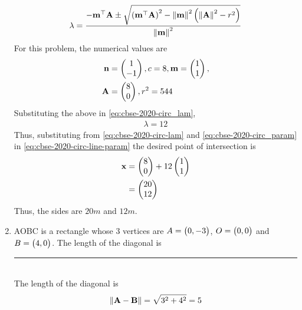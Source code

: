 \documentclass[journal,12pt,twocolumn]{IEEEtran}
\begin{document}
\begin{enumerate}
{\begin{align}
			    \label{eq:cbse-2020-circ_lam}
		\lambda = \frac{-\mathbf{m}^{\top}\mathbf{A}\pm \sqrt{\left(\mathbf{m}^{\top}\mathbf{A}\right)^2 -\left\lVert\mathbf{m}\right\rVert^2\left(\left\lVert\mathbf{A}\right\rVert^2 - r^2 \right)}}{\left\lVert\mathbf{m}\right\rVert^2}
		    \end{align}
		    }
		    For this problem, the numerical values are
		    \begin{align}
			    \label{eq:cbse-2020-circ_param}
			    \mathbf{n} &= \begin{pmatrix}1 \\ -1\end{pmatrix}, c = 8, 
		\mathbf{m} = \begin{pmatrix}1 \\ 1\end{pmatrix}, 
			    \\
			     \mathbf{A} &= \begin{pmatrix}8 \\ 0\end{pmatrix},  r^2 = 544
		    \end{align}
		    Substituting the above in 
			    \eqref{eq:cbse-2020-circ_lam}, 
		    \begin{align}
			    \lambda = 12
			    \label{eq:cbse-2020-circ-lam}
		    \end{align}
		    Thus, substituting from 
			    \eqref{eq:cbse-2020-circ-lam}
			    and 
			    \eqref{eq:cbse-2020-circ_param}
			    in 
			    \eqref{eq:cbse-2020-circ-line-param}
			    the desired point of intersection is 
		    \begin{align}
			    \mathbf{x} &= \begin{pmatrix}8 \\ 0\end{pmatrix} +  12 \begin{pmatrix}1 \\ 1\end{pmatrix}
			    \\
			    &= \begin{pmatrix}20 \\ 12\end{pmatrix}
		    \end{align}
		    Thus, the sides are $20m$ and $12m$.

\item AOBC is a rectangle whose 3 vertices are $A = \begin{pmatrix}0,-3\end{pmatrix}$, $O = \begin{pmatrix}0,0\end{pmatrix}$ and $B = \begin{pmatrix}4,0\end{pmatrix}$. The length of the diagonal is \rule{1.5cm}{0.15mm}\\
\solution
The length of the diagonal is  
  \begin{align}
	  \left\lVert\mathbf{A}-\mathbf{B}\right\rVert = \sqrt{3^2+4^2} = 5
  \end{align}
    

\end{enumerate}
\end{document}
